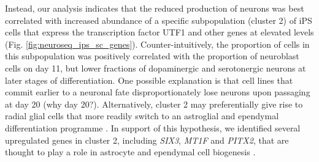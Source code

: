 Instead, our analysis indicates that the reduced production of neurons was best correlated with increased abundance of a specific subpopulation (cluster 2) of iPS cells that express the transcription factor UTF1 and other genes at elevated levels (Fig. \ref{fig:neuroseq_ips_sc_genes}).
Counter-intuitively, the proportion of cells in this subpopulation was positively correlated with the proportion of neuroblast cells on day 11, but lower fractions of dopaminergic and serotonergic neurons at later stages of differentiation. 
One possible explanation is that cell lines that commit earlier to a neuronal fate disproportionately lose neurons upon passaging at day 20 (why day 20?). 
Alternatively, cluster 2 may preferentially give rise to radial glial cells that more readily switch to an astroglial and ependymal differentiation programme \cite{spassky2005adult}. 
In support of this hypothesis, we identified several upregulated genes in cluster 2, including \textit{SIX3}, \textit{MT1F} and \textit{PITX2}, that are thought to play a role in astrocyte and ependymal cell biogenesis \cite{lavado2011six3, michael2011up, jacquet2009foxj1}. \\




